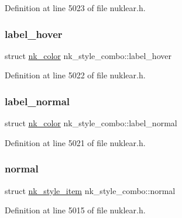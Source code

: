 Definition at line 5023 of file nuklear.\+h.

\mbox{\label{structnk__style__combo_abd355bd2a43b1e6581746bd2a4f10c6e}} 
\subsubsection{\texorpdfstring{label\+\_\+hover}{label\_hover}}
{\footnotesize\ttfamily struct \mbox{\hyperlink{structnk__color}{nk\+\_\+color}} nk\+\_\+style\+\_\+combo\+::label\+\_\+hover}



Definition at line 5022 of file nuklear.\+h.

\mbox{\label{structnk__style__combo_a381df88d0500ee26c94654dfdceb9ff5}} 
\subsubsection{\texorpdfstring{label\+\_\+normal}{label\_normal}}
{\footnotesize\ttfamily struct \mbox{\hyperlink{structnk__color}{nk\+\_\+color}} nk\+\_\+style\+\_\+combo\+::label\+\_\+normal}



Definition at line 5021 of file nuklear.\+h.

\mbox{\label{structnk__style__combo_a4eb30990e9b05c237cb40ddcd75fbc84}} 
\subsubsection{\texorpdfstring{normal}{normal}}
{\footnotesize\ttfamily struct \mbox{\hyperlink{structnk__style__item}{nk\+\_\+style\+\_\+item}} nk\+\_\+style\+\_\+combo\+::normal}



Definition at line 5015 of file nuklear.\+h.

